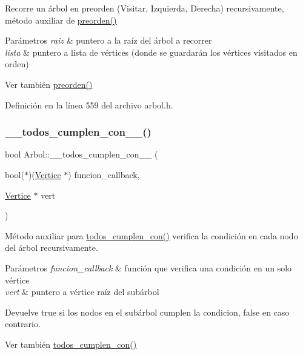 Recorre un árbol en preorden (Visitar, Izquierda, Derecha) recursivamente, método auxiliar de \hyperlink{classArbol_a0ffdc60ce8f2267366681cc94cf6beea}{preorden()} 


\begin{DoxyParams}{Parámetros}
{\em raiz} & puntero a la raíz del árbol a recorrer \\
\hline
{\em lista} & puntero a lista de vértices (donde se guardarán los vértices visitados en orden) \\
\hline
\end{DoxyParams}
\begin{DoxySeeAlso}{Ver también}
\hyperlink{classArbol_a0ffdc60ce8f2267366681cc94cf6beea}{preorden()} 
\end{DoxySeeAlso}


Definición en la línea 559 del archivo arbol.\+h.

\mbox{\label{classArbol_a60b71d79b81a3a1083709ec264332975}} 
\subsubsection{\texorpdfstring{\+\_\+\+\_\+todos\+\_\+cumplen\+\_\+con\+\_\+\+\_\+()}{\_\_todos\_cumplen\_con\_\_()}}
{\footnotesize\ttfamily bool Arbol\+::\+\_\+\+\_\+todos\+\_\+cumplen\+\_\+con\+\_\+\+\_\+ (\begin{DoxyParamCaption}\item[{bool($\ast$)(\hyperlink{classVertice}{Vertice} $\ast$)}]{funcion\+\_\+callback,  }\item[{\hyperlink{classVertice}{Vertice} $\ast$}]{vert }\end{DoxyParamCaption})\hspace{0.3cm}{\ttfamily [protected]}}



Método auxiliar para \hyperlink{classArbol_aba4b09fef18152beb43e04fee7394f34}{todos\+\_\+cumplen\+\_\+con()} verifica la condición en cada nodo del árbol recursivamente. 


\begin{DoxyParams}{Parámetros}
{\em funcion\+\_\+callback} & función que verifica una condición en un solo vértice \\
\hline
{\em vert} & puntero a vértice raíz del subárbol \\
\hline
\end{DoxyParams}
\begin{DoxyReturn}{Devuelve}
true si los nodos en el subárbol cumplen la condicion, false en caso contrario. 
\end{DoxyReturn}
\begin{DoxySeeAlso}{Ver también}
\hyperlink{classArbol_aba4b09fef18152beb43e04fee7394f34}{todos\+\_\+cumplen\+\_\+con()} 
\end{DoxySeeAlso}



